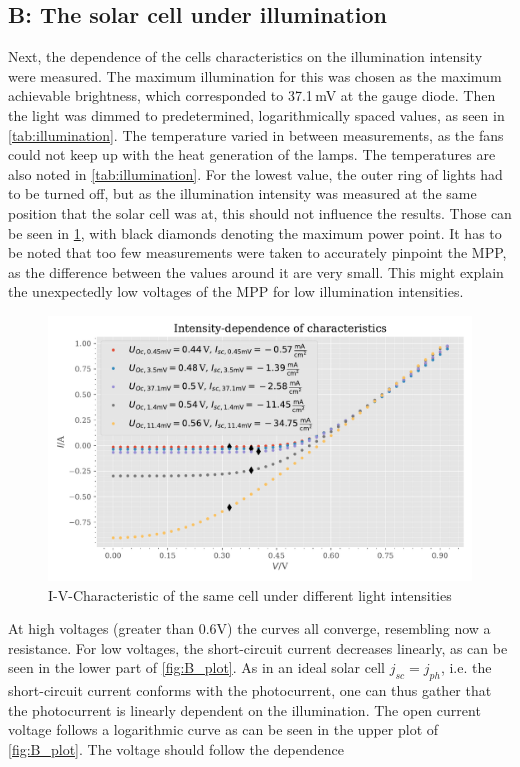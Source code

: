 \documentclass[english,  %
parskip=full,  %
headsepline]{scrartcl}
\begin{document}
\subsection{B: The solar cell under illumination}
Next, the dependence of the cells characteristics on the illumination intensity were measured. The maximum illumination for this was chosen as the maximum achievable brightness, which corresponded to 37.1\,mV at the gauge diode. Then the light was dimmed to predetermined, logarithmically spaced values, as seen in \cref{tab:illumination}. The temperature varied in between measurements, as the fans could not keep up with the heat generation of the lamps. The temperatures are also noted in \cref{tab:illumination}. For the lowest value, the outer ring of lights had to be turned off, but as the illumination intensity was measured at the same position that the solar cell was at, this should not influence the results. Those can be seen in \cref{fig:B}, with black diamonds denoting the maximum power point. It has to be noted that too few measurements were taken to accurately pinpoint the MPP, as the difference between the values around it are very small. This might explain the unexpectedly low voltages of the MPP for low illumination intensities.\\
\begin{figure}[H]
    \centering
    \includegraphics[width=\linewidth]{B.pdf}
    \caption{I-V-Characteristic of the same cell under different light intensities}
    \label{fig:B}
\end{figure}
At high voltages (greater than 0.6V) the curves all converge, resembling now a resistance. For low voltages, the short-circuit current decreases linearly, as can be seen in the lower part of \cref{fig:B_plot}. As in an ideal solar cell $j_{sc}=j_{ph}$, i.e. the short-circuit current conforms with the photocurrent, one can thus gather that the photocurrent is linearly dependent on the illumination. The open current voltage follows a logarithmic curve as can be seen in the upper plot of \cref{fig:B_plot}. The voltage should follow the dependence \cite{pved}
\end{document}
